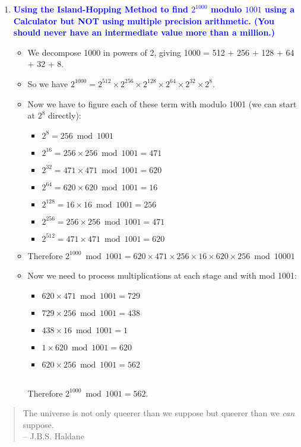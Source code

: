 \documentclass[11pt]{article}
\begin{document}
\begin{enumerate}
\item \textbf{\textcolor{blue}{Using the Island-Hopping Method to find $2^{1000}$ modulo $1001$ using a Calculator but NOT using multiple precision arithmetic. (You should never have an intermediate value more than a million.)}}
    \begin{itemize}
        \item We decompose 1000 in powers of 2, giving 1000 = 512 + 256 + 128 + 64 + 32 + 8.
        \item So we have $2^{1000} = 2^{512} \times 2^{256} \times 2^{128} \times 2^{64} \times 2^{32} \times 2^8$.
        \item Now we have to figure each of these term with modulo 1001 (we can start at $2^8$ directly):
        \begin{itemize}[label={***}]
            \item $2^{8} = 256 \bmod{1001}$
            \item $2^{16} = 256 \times 256 \bmod{1001} = 471$
            \item $2^{32} = 471 \times 471 \bmod{1001} = 620$
            \item $2^{64} = 620 \times 620 \bmod{1001} = 16$
            \item $2^{128} = 16 \times 16 \bmod{1001} = 256$
            \item $2^{256} = 256 \times 256 \bmod{1001} = 471$
            \item $2^{512} = 471 \times 471 \bmod{1001} = 620$
        \end{itemize}
        \item Therefore $2^{1000} \bmod{1001} = 620 \times 471 \times 256 \times 16 \times 620 \times 256 \bmod{10001}$
        \item Now we need to process multiplications at each stage and with mod 1001:
        \begin{itemize}[label={***}]
            \item $620 \times 471 \bmod{1001} = 729$
            \item $729 \times 256 \bmod{1001} = 438$
            \item $438 \times 16 \bmod{1001} = 1$
            \item $1 \times 620 \bmod{1001} = 620$
            \item $620 \times 256 \bmod{1001} = 562$          
        \end{itemize}
        \\ Therefore $2^{1000} \bmod{1001} = 562$.
    \end{itemize}

\end{enumerate}

\begin{quote}
The universe is not only queerer than we suppose but queerer than we {\em can}
suppose.  \\ -- J.B.S. Haldane
\end{quote}
\end{document}
